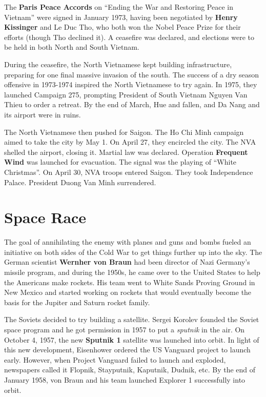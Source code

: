 The \textbf{Paris Peace Accords} on ``Ending the War and Restoring Peace in Vietnam''
were signed in January 1973,
having been negotiated by \textbf{Henry Kissinger} and Le Duc Tho,
who both won the Nobel Peace Prize for their efforts (though Tho declined it).
A ceasefire was declared, and elections were to be held in both North and South Vietnam.

During the ceasefire, the North Vietnamese kept building infrastructure,
preparing for one final massive invasion of the south.
The success of a dry season offensive in 1973-1974 inspired the North Vietnamese to try again.
In 1975, they launched Campaign 275,
prompting President of South Vietnam Nguyen Van Thieu to order a retreat.
By the end of March, Hue and fallen, and Da Nang and its airport were in ruins.

The North Vietnamese then pushed for Saigon.
The Ho Chi Minh campaign aimed to take the city by May 1.
On April 27, they encircled the city.
The NVA shelled the airport, closing it.
Martial law was declared.
Operation \textbf{Frequent Wind} was launched for evacuation.
The signal was the playing of ``White Christmas''.
On April 30, NVA troops entered Saigon.
They took Independence Palace.
President Duong Van Minh surrendered.

\section{Space Race}

The goal of annihilating the enemy with planes and guns and bombs
fueled an initiative on both sides of the Cold War to get things further up into the sky.
The German scientist \textbf{Wernher von Braun} had been director of Nazi Germany's missile program,
and during the 1950s, he came over to the United States to help the Americans make rockets.
His team went to White Sands Proving Ground in New Mexico and started working on rockets
that would eventually become the basis for the Jupiter and Saturn rocket family.

The Soviets decided to try building a satellite.
Sergei Korolev founded the Soviet space program and he got permission in 1957
to put a \textit{sputnik} in the air.
On October 4, 1957, the new \textbf{Sputnik 1} satellite was launched into orbit.
In light of this new development, Eisenhower ordered the US Vanguard project to launch early.
However, when Project Vanguard failed to launch and exploded,
newspapers called it Flopnik, Stayputnik, Kaputnik, Dudnik, etc.
By the end of January 1958, von Braun and his team launched Explorer 1 successfully into orbit.

